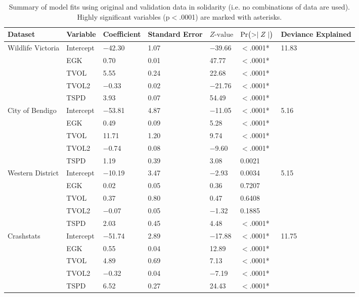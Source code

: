 \begin{table}[htp]
\caption[Summary of model fits using original and validation data]{Summary of model fits using original and validation data in solidarity (i.e. no combinations of data are used). Highly significant variables (p$<$.0001) are marked with asterisks.}
\centering
\begin{tabularx}{0.9\textwidth}{lllllll} \toprule
Dataset & Variable & Coefficient & Standard Error & $Z\text{-value}$ & $\text{Pr}\bigl( >\mid Z \mid \bigr)$ & Deviance Explained \\ 
  \midrule
Wildlife Victoria & Intercept & $-$42.30 & 1.07 & $-$39.66 & $<$.0001* & 11.83 \\ 
   & EGK & 0.70 & 0.01 & 47.77 & $<$.0001* &  \\ 
   & TVOL & 5.55 & 0.24 & 22.68 & $<$.0001* &  \\ 
   & TVOL2 & $-$0.33 & 0.02 & $-$21.76 & $<$.0001* &  \\ 
   & TSPD & 3.93 & 0.07 & 54.49 & $<$.0001* &  \\ 
  City of Bendigo & Intercept & $-$53.81 & 4.87 & $-$11.05 & $<$.0001* & 5.16 \\ 
   & EGK & 0.49 & 0.09 & 5.28 & $<$.0001* &  \\ 
   & TVOL & 11.71 & 1.20 & 9.74 & $<$.0001* &  \\ 
   & TVOL2 & $-$0.74 & 0.08 & $-$9.60 & $<$.0001* &  \\ 
   & TSPD & 1.19 & 0.39 & 3.08 & 0.0021 &  \\ 
  Western District & Intercept & $-$10.19 & 3.47 & $-$2.93 & 0.0034 & 5.15 \\ 
   & EGK & 0.02 & 0.05 & 0.36 & 0.7207 &  \\ 
   & TVOL & 0.37 & 0.80 & 0.47 & 0.6408 &  \\ 
   & TVOL2 & $-$0.07 & 0.05 & $-$1.32 & 0.1885 &  \\ 
   & TSPD & 2.03 & 0.45 & 4.48 & $<$.0001* &  \\ 
  Crashstats & Intercept & $-$51.74 & 2.89 & $-$17.88 & $<$.0001* & 11.75 \\ 
   & EGK & 0.55 & 0.04 & 12.89 & $<$.0001* &  \\ 
   & TVOL & 4.89 & 0.69 & 7.13 & $<$.0001* &  \\ 
   & TVOL2 & $-$0.32 & 0.04 & $-$7.19 & $<$.0001* &  \\ 
   & TSPD & 6.52 & 0.27 & 24.43 & $<$.0001* &  \\ 
\bottomrule
\end{tabularx}
\label{val_glm_perf}
\end{table}

